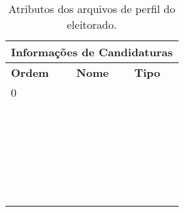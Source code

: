 \begin{table}[h!]
    \centering
    \begin{tabular}{|l|l|l|}
        \hline
        \multicolumn{3}{|c|}{\textbf{Informações de Candidaturas}} \\
        \hline
        \textbf{Ordem} &  \textbf{Nome} & \textbf{Tipo}   \\
        \hline
        0 &  & \\
        \hline
        & & \\
        \hline
        & & \\
        \hline
        & & \\
        \hline
        & & \\
        \hline
        & & \\
        \hline
        & & \\
        \hline
        & & \\
        \hline
        & & \\
        \hline
        & & \\
        \hline
        & & \\
        \hline
        & & \\
        \hline
        & & \\
        \hline
        & & \\
        \hline
        & & \\
        \hline
        & & \\
        \hline
        & & \\
        \hline
        & & \\
        \hline
        & & \\
        \hline
        & & \\
        \hline
        & & \\
        \hline
        & & \\
        \hline
        & & \\
        \hline
        & & \\
        \hline
        & & \\
        \hline
        & & \\
        \hline
    \end{tabular}
    \caption{Atributos dos arquivos de perfil do eleitorado.}
    \label{tab:candidaturas}
\end{table}


